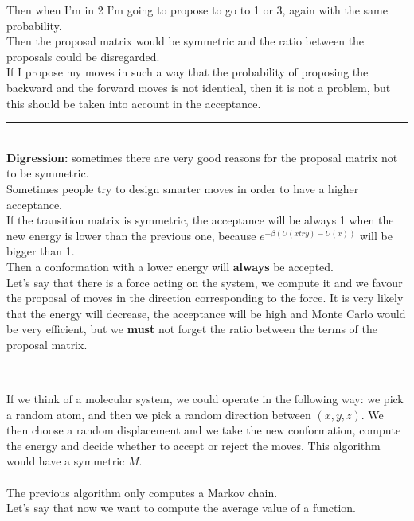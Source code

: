 Then when I'm in 2 I'm going to propose to go to 1 or 3, again with the same probability.\\
Then the proposal matrix would be symmetric and the ratio between the proposals could be disregarded.\\
If I propose my moves in such a way that the probability of proposing the backward and the forward moves is not identical, then it is not a problem, but this should be taken into account in the acceptance.\\
\noindent\rule{8cm}{0.4pt}\\
\textbf{Digression: }sometimes there are very good reasons for the proposal matrix not to be symmetric.\\
Sometimes people try to design smarter moves in order to have a higher acceptance.\\ 
If the transition matrix is symmetric, the acceptance will be always 1 when the new energy is lower than the previous one, because $e^{-\beta(U(xtry)-U(x))}$ will be bigger than 1.\\ 
Then a conformation with a lower energy will \textbf{always} be accepted.\\
Let's say that there is a force acting on the system, we compute it and we favour the proposal of moves in the direction corresponding to the force. It is very likely that the energy will decrease, the acceptance will be high and Monte Carlo would be very efficient, but we \textbf{must} not forget the ratio between the terms of the proposal matrix.\\
\noindent\rule{8cm}{0.4pt}\\
If we think of a molecular system, we could operate in the following way: we pick a random atom, and then we pick a random direction between $(x,y,z)$. We then choose a random displacement and we take the new conformation, compute the energy and decide whether to accept or reject the moves. This algorithm would have a symmetric $M$.\\\\
The previous algorithm only computes a Markov chain.\\
Let's say that now we want to compute the average value of a function.\\
